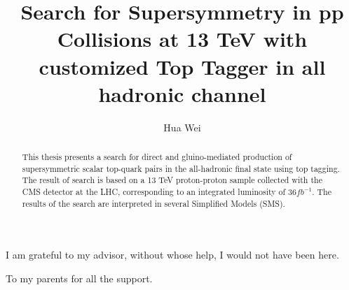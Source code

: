 \documentclass[oneside,final,letterpaper]{ucr}
\begin{document}

\title{Search for Supersymmetry in pp Collisions at 13 TeV with customized Top Tagger in all hadronic channel}
\author{Hua Wei}

\maketitle
\copyrightpage{}
\approvalpage{}

\begin{frontmatter}

\begin{acknowledgements}
I am grateful to my advisor, without whose help, I would not have been here.
\end{acknowledgements}
\begin{dedication}
\null\vfil
{\large
\begin{center}
To my parents for all the support.
\end{center}
}
\vfil\null
\end{dedication}
\begin{abstract}
This thesis presents a search for direct and gluino-mediated production of supersymmetric scalar top-quark pairs in the all-hadronic final state using top tagging. The result of search is based on a 13 TeV proton-proton sample collected with the CMS detector at the LHC, corresponding to an integrated luminosity of $36 fb^{-1}$. The results of the search are interpreted in several Simplified Models (SMS).
\end{abstract}
\tableofcontents
\listoffigures
\listoftables
\end{frontmatter}








\nocite{*}
% 



\appendix

%
\end{document}
